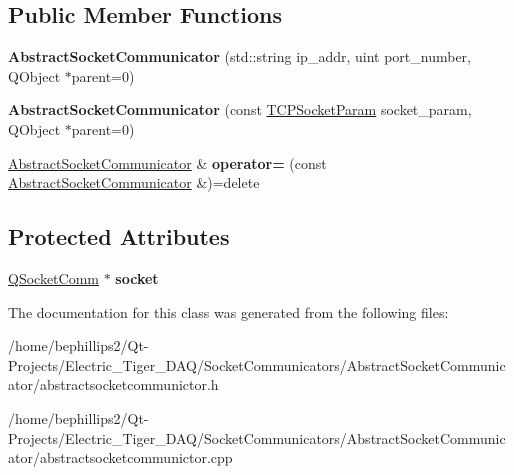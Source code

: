 \subsection*{Public Member Functions}
\begin{DoxyCompactItemize}
\item 
{\bfseries Abstract\+Socket\+Communicator} (std\+::string ip\+\_\+addr, uint port\+\_\+number, Q\+Object $\ast$parent=0)\hypertarget{class_abstract_socket_communicator_a421d86ea7de8b9f2e726e4c1a8a03a42}{}\label{class_abstract_socket_communicator_a421d86ea7de8b9f2e726e4c1a8a03a42}

\item 
{\bfseries Abstract\+Socket\+Communicator} (const \hyperlink{struct_t_c_p_socket_param}{T\+C\+P\+Socket\+Param} socket\+\_\+param, Q\+Object $\ast$parent=0)\hypertarget{class_abstract_socket_communicator_a84fed194f0cb2cca744be18d741d6129}{}\label{class_abstract_socket_communicator_a84fed194f0cb2cca744be18d741d6129}

\item 
\hyperlink{class_abstract_socket_communicator}{Abstract\+Socket\+Communicator} \& {\bfseries operator=} (const \hyperlink{class_abstract_socket_communicator}{Abstract\+Socket\+Communicator} \&)=delete\hypertarget{class_abstract_socket_communicator_a7ee57a3af5927ac08f515055dbcdc829}{}\label{class_abstract_socket_communicator_a7ee57a3af5927ac08f515055dbcdc829}

\end{DoxyCompactItemize}
\subsection*{Protected Attributes}
\begin{DoxyCompactItemize}
\item 
\hyperlink{class_q_socket_comm}{Q\+Socket\+Comm} $\ast$ {\bfseries socket}\hypertarget{class_abstract_socket_communicator_a7e69037572c26cf596bd117490f9d6c1}{}\label{class_abstract_socket_communicator_a7e69037572c26cf596bd117490f9d6c1}

\end{DoxyCompactItemize}


The documentation for this class was generated from the following files\+:\begin{DoxyCompactItemize}
\item 
/home/bephillips2/\+Qt-\/\+Projects/\+Electric\+\_\+\+Tiger\+\_\+\+D\+A\+Q/\+Socket\+Communicators/\+Abstract\+Socket\+Communicator/abstractsocketcommunictor.\+h\item 
/home/bephillips2/\+Qt-\/\+Projects/\+Electric\+\_\+\+Tiger\+\_\+\+D\+A\+Q/\+Socket\+Communicators/\+Abstract\+Socket\+Communicator/abstractsocketcommunictor.\+cpp\end{DoxyCompactItemize}
